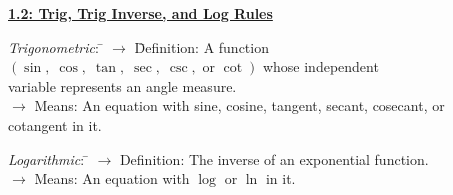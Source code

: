 \textbf{\underline{\large{1.2: Trig, Trig Inverse, and Log Rules}}} \par

\begin{tabbing}
    \textit{Trigonometric}: \= $\rightarrow$ \= Definition: A function $(\sin, \; \cos, \; \tan, \; \sec, \; \csc, \text{ or } \cot)$ whose independent \\ \> \> variable represents an angle measure. \\[5.5pt]
    \> $\rightarrow$ Means: An equation with sine, cosine, tangent, secant, cosecant, or \\ \> \> cotangent in it.
\end{tabbing}
\begin{tabbing}
    \textit{Logarithmic}: \= $\rightarrow$ Definition: The inverse of an exponential function. \\[5.5pt]
    \> $\rightarrow$ Means: An equation with $\log$ or $\ln$ in it.
\end{tabbing}

\begin{center}
\end{center}
\begin{center}
\end{center}

